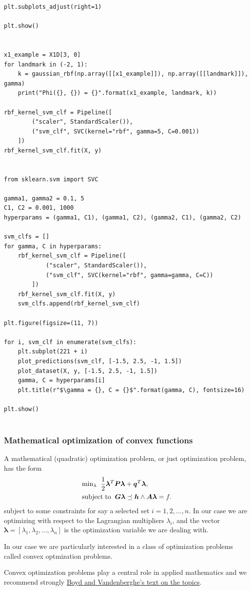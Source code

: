 \documentclass{beamer}
\begin{document}
\begin{frame}
\begin{lstlisting}
plt.subplots_adjust(right=1)

plt.show()


x1_example = X1D[3, 0]
for landmark in (-2, 1):
    k = gaussian_rbf(np.array([[x1_example]]), np.array([[landmark]]), gamma)
    print("Phi({}, {}) = {}".format(x1_example, landmark, k))

rbf_kernel_svm_clf = Pipeline([
        ("scaler", StandardScaler()),
        ("svm_clf", SVC(kernel="rbf", gamma=5, C=0.001))
    ])
rbf_kernel_svm_clf.fit(X, y)


from sklearn.svm import SVC

gamma1, gamma2 = 0.1, 5
C1, C2 = 0.001, 1000
hyperparams = (gamma1, C1), (gamma1, C2), (gamma2, C1), (gamma2, C2)

svm_clfs = []
for gamma, C in hyperparams:
    rbf_kernel_svm_clf = Pipeline([
            ("scaler", StandardScaler()),
            ("svm_clf", SVC(kernel="rbf", gamma=gamma, C=C))
        ])
    rbf_kernel_svm_clf.fit(X, y)
    svm_clfs.append(rbf_kernel_svm_clf)

plt.figure(figsize=(11, 7))

for i, svm_clf in enumerate(svm_clfs):
    plt.subplot(221 + i)
    plot_predictions(svm_clf, [-1.5, 2.5, -1, 1.5])
    plot_dataset(X, y, [-1.5, 2.5, -1, 1.5])
    gamma, C = hyperparams[i]
    plt.title(r"$\gamma = {}, C = {}$".format(gamma, C), fontsize=16)

plt.show()


\end{lstlisting}
\end{frame}

\begin{frame}
\frametitle{Mathematical optimization of convex functions}

A mathematical (quadratic) optimization problem, or just optimization problem, has the form
\begin{align*}
    &\mathrm{min}_{\lambda}\hspace{0.2cm} \frac{1}{2}\bm{\lambda}^T\bm{P}\bm{\lambda}+\bm{q}^T\bm{\lambda},\\ \nonumber
    &\mathrm{subject\hspace{0.1cm}to} \hspace{0.2cm} \bm{G}\bm{\lambda} \preceq \bm{h} \wedge  \bm{A}\bm{\lambda}=f.
\end{align*}
subject to some constraints for say a selected set $i=1,2,\dots, n$.
In our case we are optimizing with respect to the Lagrangian multipliers $\lambda_i$, and the
vector $\bm{\lambda}=[\lambda_1, \lambda_2,\dots, \lambda_n]$ is the optimization variable we are dealing with.

In our case we are particularly interested in a class of optimization
problems called convex optmization problems.

Convex optimization problems play a central role in applied mathematics and we recommend strongly \href{{http://web.stanford.edu/~boyd/cvxbook/}}{Boyd and Vandenberghe's text on the topics}.
\end{frame}
\end{document}
